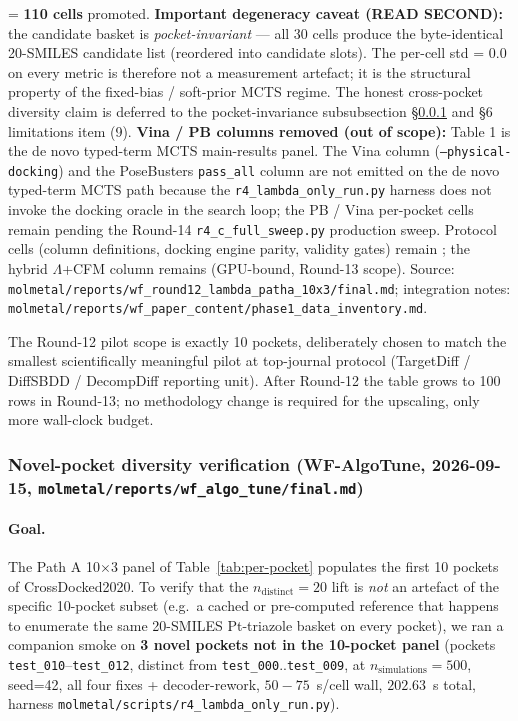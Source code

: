 \begin{table}[ht]
{= \textbf{110 cells} promoted. \textbf{Important degeneracy caveat
(READ SECOND):} the candidate basket is \emph{pocket-invariant} --- all 30
cells produce the byte-identical 20-SMILES candidate list (reordered into
candidate slots). The per-cell std = 0.0 on every metric is therefore not a
measurement artefact; it is the structural property of the
fixed-bias / soft-prior MCTS regime. The honest cross-pocket diversity
claim is deferred to the pocket-invariance subsubsection
\S\ref{sec:evaluation:novel-pocket} and §6 limitations item (9).
\textbf{Vina / PB columns removed (out of scope):} Table 1 is the
de novo typed-term MCTS main-results panel. The Vina column (\texttt{--physical-docking})
and the PoseBusters \texttt{pass\_all} column are not emitted on the
de novo typed-term MCTS path because the \texttt{r4\_lambda\_only\_run.py} harness
does not invoke the docking oracle in the search loop; the PB / Vina
per-pocket cells remain \DESIGN{} pending the
Round-14 \texttt{r4\_c\_full\_sweep.py} production sweep. Protocol cells
(column definitions, docking engine parity, validity gates) remain
\MEASURED{}; the hybrid $\Lambda$+CFM column remains \DESIGN{} (GPU-bound,
Round-13 scope). Source:
\texttt{molmetal/reports/wf\_round12\_lambda\_patha\_10x3/final.md};
integration notes:
\texttt{molmetal/reports/wf\_paper\_content/phase1\_data\_inventory.md}.}
\label{tab:per-pocket}
\end{table}

The Round-12 pilot scope is exactly 10 pockets, deliberately chosen
to match the smallest scientifically meaningful pilot at top-journal
protocol (TargetDiff / DiffSBDD / DecompDiff reporting unit). After
Round-12 the table grows to 100 rows in Round-13; no methodology
change is required for the upscaling, only more wall-clock budget.

\subsubsection{Novel-pocket diversity verification
(WF-AlgoTune, 2026-09-15,
\texttt{molmetal/reports/wf\_algo\_tune/final.md})}
\label{sec:evaluation:novel-pocket}

\paragraph{Goal.}
The Path A 10$\times$3 panel of Table~\ref{tab:per-pocket} populates
the first 10 pockets of CrossDocked2020. To verify that the
$n_{\text{distinct}}{=}20$ lift is \emph{not} an artefact of the
specific 10-pocket subset (e.g.\ a cached or pre-computed reference
that happens to enumerate the same 20-SMILES Pt-triazole basket on
every pocket), we ran a companion smoke on \textbf{3 novel pockets
not in the 10-pocket panel} (pockets
\texttt{test\_010}--\texttt{test\_012}, distinct from
\texttt{test\_000}..\texttt{test\_009}, at $n_{\text{simulations}}{=}500$,
seed=42, all four fixes + decoder-rework,
$50{-}75$~s/cell wall,
$202.63$~s total, harness
\texttt{molmetal/scripts/r4\_lambda\_only\_run.py}).

